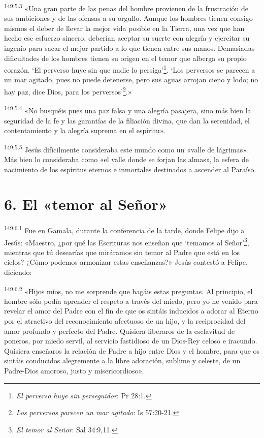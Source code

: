 \par 
\textsuperscript{149:5.3} «Una gran parte de las penas del hombre provienen de la frustración de sus ambiciones y de las ofensas a su orgullo. Aunque los hombres tienen consigo mismos el deber de llevar la mejor vida posible en la Tierra, una vez que han hecho ese esfuerzo sincero, deberían aceptar su suerte con alegría y ejercitar su ingenio para sacar el mejor partido a lo que tienen entre sus manos. Demasiadas dificultades de los hombres tienen su origen en el temor que alberga su propio corazón. `El perverso huye sin que nadie lo persiga'\footnote{\textit{El perverso huye sin perseguidor}: Pr 28:1.}. `Los perversos se parecen a un mar agitado, pues no puede detenerse, pero sus aguas arrojan cieno y lodo; no hay paz, dice Dios, para los perversos'\footnote{\textit{Los perversos parecen un mar agitado}: Is 57:20-21.}.»

\par 
\textsuperscript{149:5.4} «No busquéis pues una paz falsa y una alegría pasajera, sino más bien la seguridad de la fe y las garantías de la filiación divina, que dan la serenidad, el contentamiento y la alegría suprema en el espíritu».

\par 
\textsuperscript{149:5.5} Jesús difícilmente consideraba este mundo como un «valle de lágrimas». Más bien lo consideraba como «el valle donde se forjan las almas», la esfera de nacimiento de los espíritus eternos e inmortales destinados a ascender al Paraíso.

\section*{6. El «temor al Señor»}
\par 
\textsuperscript{149:6.1} Fue en Gamala, durante la conferencia de la tarde, donde Felipe dijo a Jesús: «Maestro, ¿por qué las Escrituras nos enseñan que `temamos al Señor'\footnote{\textit{El temor al Señor}: Sal 34:9,11.}, mientras que tú desearías que miráramos sin temor al Padre que está en los cielos? ¿Cómo podemos armonizar estas enseñanzas?» Jesús contestó a Felipe, diciendo:

\par 
\textsuperscript{149:6.2} «Hijos míos, no me sorprende que hagáis estas preguntas. Al principio, el hombre sólo podía aprender el respeto a través del miedo, pero yo he venido para revelar el amor del Padre con el fin de que os sintáis inducidos a adorar al Eterno por el atractivo del reconocimiento afectuoso de un hijo, y la reciprocidad del amor profundo y perfecto del Padre. Quisiera liberaros de la esclavitud de poneros, por miedo servil, al servicio fastidioso de un Dios-Rey celoso e iracundo. Quisiera enseñaros la relación de Padre a hijo entre Dios y el hombre, para que os sintáis conducidos alegremente a la libre adoración, sublime y celeste, de un Padre-Dios amoroso, justo y misericordioso».


